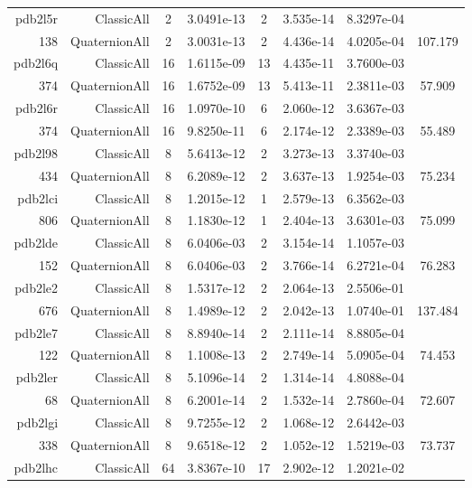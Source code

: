 \begin{xltabular}{\textwidth}{r|rcS[table-format=1.4e+2]cS[table-format=1.3e+2]S[table-format=1.4e+2]S[table-format=-1.3]}
pdb2l5r & ClassicAll & 2 & 3.0491e-13 & 2 & 3.535e-14 & 8.3297e-04 & \\
138 & QuaternionAll & 2 & 3.0031e-13 & 2 & 4.436e-14 & 4.0205e-04 & 107.179\\  \addlinespace
pdb2l6q & ClassicAll & 16 & 1.6115e-09 & 13 & 4.435e-11 & 3.7600e-03 & \\
374 & QuaternionAll & 16 & 1.6752e-09 & 13 & 5.413e-11 & 2.3811e-03 & 57.909\\  \addlinespace
pdb2l6r & ClassicAll & 16 & 1.0970e-10 & 6 & 2.060e-12 & 3.6367e-03 & \\
374 & QuaternionAll & 16 & 9.8250e-11 & 6 & 2.174e-12 & 2.3389e-03 & 55.489\\  \addlinespace
pdb2l98 & ClassicAll & 8 & 5.6413e-12 & 2 & 3.273e-13 & 3.3740e-03 & \\
434 & QuaternionAll & 8 & 6.2089e-12 & 2 & 3.637e-13 & 1.9254e-03 & 75.234\\  \addlinespace
pdb2lci & ClassicAll & 8 & 1.2015e-12 & 1 & 2.579e-13 & 6.3562e-03 & \\
806 & QuaternionAll & 8 & 1.1830e-12 & 1 & 2.404e-13 & 3.6301e-03 & 75.099\\  \addlinespace
pdb2lde & ClassicAll & 8 & 6.0406e-03 & 2 & 3.154e-14 & 1.1057e-03 & \\
152 & QuaternionAll & 8 & 6.0406e-03 & 2 & 3.766e-14 & 6.2721e-04 & 76.283\\  \addlinespace
pdb2le2 & ClassicAll & 8 & 1.5317e-12 & 2 & 2.064e-13 & 2.5506e-01 & \\
676 & QuaternionAll & 8 & 1.4989e-12 & 2 & 2.042e-13 & 1.0740e-01 & 137.484\\  \addlinespace
pdb2le7 & ClassicAll & 8 & 8.8940e-14 & 2 & 2.111e-14 & 8.8805e-04 & \\
122 & QuaternionAll & 8 & 1.1008e-13 & 2 & 2.749e-14 & 5.0905e-04 & 74.453\\  \addlinespace
pdb2ler & ClassicAll & 8 & 5.1096e-14 & 2 & 1.314e-14 & 4.8088e-04 & \\
68 & QuaternionAll & 8 & 6.2001e-14 & 2 & 1.532e-14 & 2.7860e-04 & 72.607\\  \addlinespace
pdb2lgi & ClassicAll & 8 & 9.7255e-12 & 2 & 1.068e-12 & 2.6442e-03 & \\
338 & QuaternionAll & 8 & 9.6518e-12 & 2 & 1.052e-12 & 1.5219e-03 & 73.737\\  \addlinespace
pdb2lhc & ClassicAll & 64 & 3.8367e-10 & 17 & 2.902e-12 & 1.2021e-02 & \\

\end{xltabular}
